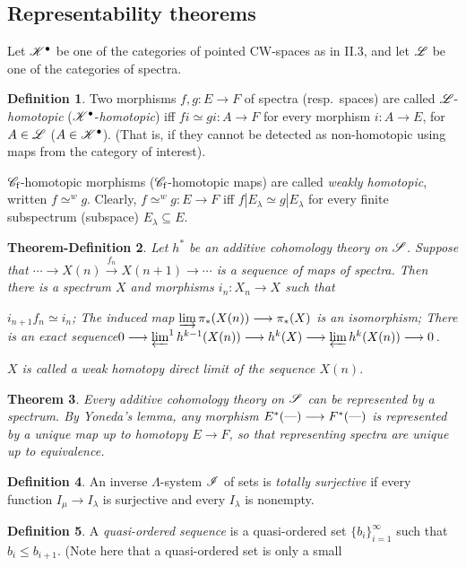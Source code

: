 \documentclass[11pt]{article}
\renewcommand{\comment}{}
\theoremstyle{plain}
\newtheorem{thm}{Theorem}[subsection]
\newtheorem{thmdef}[thm]{Theorem-Definition}
\theoremstyle{definition}
\newtheorem{defn}[thm]{Definition}
\newcommand{\CWf}{\scrC_\textup{f}}
\newcommand{\Specf}{\scrC_\textup{f}}
\begin{document}
\subsection{Representability theorems}
\comment{
\setcounter{thm}{2}
Let $\scrK^\bullet$ be one of the categories of pointed CW-spaces as in II.3,
and let $\scrL$ be one of the categories of spectra.
\begin{defn}
Two morphisms $f,g:E\to F$ of spectra (resp.\ spaces) are called
$\scrL$-\emph{homotopic} ($\scrK^\bullet$-\emph{homotopic}) iff $fi\simeq
gi:A\to F$ for every morphism $i:A\to E$, for $A\in\scrL$ ($A\in\scrK^\bullet$).
(That is, if they cannot be detected as non-homotopic using maps from the
category of interest).

$\Specf$-homotopic morphisms ($\CWf$-homotopic maps) are called \emph{weakly
homotopic}, written $f\simeq^wg$. Clearly, $f\simeq^wg:E\to F$ iff
$f|E_\lambda\simeq g|E_\lambda$ for every finite subspectrum (subspace)
$E_\lambda\subseteq E$.
\end{defn}
\begin{thmdef}
Let $h^*$ be an additive cohomology theory on $\scrS$. Suppose that $\cdots\to
X(n)\xrightarrow{\,f_n\,}X(n+1)\to\cdots$ is a sequence of maps of spectra. Then
there is a spectrum $X$ and morphisms $i_n:X_n\to X$ such that\upcol
\begin{itemise}
\itm[(i)] $i_{n+1}f_n\simeq i_n$;
\itm[(ii)] The induced map $\varinjlim\pi_*(X(n))\to\pi_*(X)$ is an isomorphism;
\itm[(iii)]There is an exact sequence\upcol $0\to\varprojlim^1 h^{k-1}(X(n))\to
h^k(X)\to \varprojlim h^k(X(n))\to0$.
\end{itemise}
$X$ is called a \emph{weak homotopy direct limit} of the sequence $X(n)$.
\end{thmdef}
\setcounter{thm}{5}
\begin{thm}
Every additive cohomology theory on $\scrS$ can be represented by a spectrum. By
Yoneda's lemma, any morphism $E^*(\DASH)\to F^*(\DASH)$ is represented by a
unique map up to homotopy $E\to F$, so that representing spectra are unique up
to equivalence.
\end{thm}
\begin{defn}
An inverse $\Lambda$-system $\scrI$ of sets is \emph{totally surjective} if
every function $I_\mu\to I_\lambda$ is surjective and every $I_\lambda$ is
nonempty.
\end{defn}
\begin{defn}
A \emph{quasi-ordered sequence} is a quasi-ordered set $\{b_i\}_{i=1}^\infty$
such that $b_i\leq b_{i+1}$. (Note here that a quasi-ordered set is only a small

\end{defn}}
\end{document}

